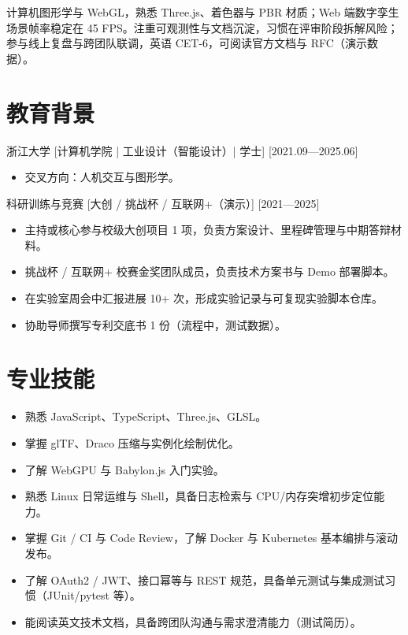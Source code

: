\documentclass{resume-photo}
\begin{document}

\ResumeTitle

\noindent 计算机图形学与 WebGL，熟悉 Three.js、着色器与 PBR 材质；Web 端数字孪生场景帧率稳定在 45 FPS。注重可观测性与文档沉淀，习惯在评审阶段拆解风险；参与线上复盘与跨团队联调，英语 CET-6，可阅读官方文档与 RFC（演示数据）。

\section{教育背景}
\ResumeItem
{浙江大学}
[\textnormal{计算机学院 | 工业设计（智能设计）| 学士}]
[2021.09—2025.06]

\begin{itemize}
  \item 交叉方向：人机交互与图形学。
\end{itemize}


\ResumeItem
{科研训练与竞赛}
[\textnormal{大创 / 挑战杯 / 互联网+（演示）}]
[2021—2025]

\begin{itemize}
  \item 主持或核心参与校级大创项目 1 项，负责方案设计、里程碑管理与中期答辩材料。
  \item 挑战杯 / 互联网+ 校赛金奖团队成员，负责技术方案书与 Demo 部署脚本。
  \item 在实验室周会中汇报进展 10+ 次，形成实验记录与可复现实验脚本仓库。
  \item 协助导师撰写专利交底书 1 份（流程中，测试数据）。
\end{itemize}



\section{专业技能}
\begin{itemize}
  \item 熟悉 JavaScript、TypeScript、Three.js、GLSL。
  \item 掌握 glTF、Draco 压缩与实例化绘制优化。
  \item 了解 WebGPU 与 Babylon.js 入门实验。
  \item 熟悉 Linux 日常运维与 Shell，具备日志检索与 CPU/内存突增初步定位能力。
  \item 掌握 Git / CI 与 Code Review，了解 Docker 与 Kubernetes 基本编排与滚动发布。
  \item 了解 OAuth2 / JWT、接口幂等与 REST 规范，具备单元测试与集成测试习惯（JUnit/pytest 等）。
  \item 能阅读英文技术文档，具备跨团队沟通与需求澄清能力（测试简历）。
\end{itemize}
\end{document}
